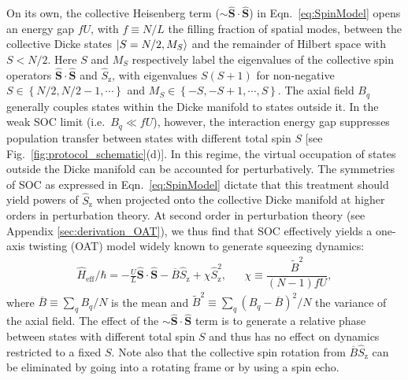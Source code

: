 \documentclass[aps,prx,superscriptaddress,notitlepage,twocolumn,longbibliography]{revtex4-2}
\renewcommand{\t}{\text} %
\newcommand{\f}[2]{\dfrac{#1}{#2}} %
\newcommand{\p}[1]{\left(#1\right)} %
\renewcommand{\set}[1]{\left\{#1\right\}} %
\renewcommand{\c}{\cdot} %
\renewcommand{\v}{\bm} %
\renewcommand{\ket}{\Ket}
\newcommand{\z}{\text{z}}
\begin{document}
On its own, the collective Heisenberg term ($\sim\hat{\v S}\c\hat{\v S}$) in Eqn.~\eqref{eq:SpinModel} opens an energy gap $fU$, with $f\equiv N/L$ the filling fraction of spatial modes, between the collective Dicke states $\ket{S=N/2, M_S}$ and the remainder of Hilbert space\cite{rey2008manybody, martin2013quantum, norcia2018cavitymediated, smale2019observation} with $S<N/2$.
Here $S$ and $M_S$ respectively label the eigenvalues of the collective spin operators $\hat{\v S}\c\hat{\v S}$ and $\hat{S}_\z$, with eigenvalues $S(S+1)$ for non-negative $S\in\set{N/2,N/2-1,\cdots}$ and $M_S\in\set{-S,-S+1,\cdots,S}$.
The axial field $B_q$ generally couples states within the Dicke manifold to states outside it.
In the weak SOC limit (i.e.~$B_q\ll fU$), however, the interaction energy gap suppresses population transfer between states with different total spin $S$ [see Fig.~\ref{fig:protocol_schematic}(d)].
In this regime, the virtual occupation of states outside the Dicke manifold can be accounted for perturbatively.
The symmetries of SOC as expressed in Eqn.~\eqref{eq:SpinModel} dictate that this treatment should yield powers of $\hat S_\z$ when projected onto the collective Dicke manifold at higher orders in perturbation theory.
At second order in perturbation theory (see Appendix \ref{sec:derivation_OAT}), we thus find that SOC effectively yields a one-axis twisting (OAT) model widely known to generate squeezing dynamics\cite{kitagawa1993squeezed, ma2011quantum}:
\begin{align}
  \hat H_{\t{eff}}/\hbar
  = -\frac{U}{L} \hat{\v S} \c \hat{\v S}
  - \overline B \hat S_\z + \chi \hat S_\z^2,
  &&
  \chi \equiv \f{\widetilde B^2}{(N-1)fU},
  \label{eq:H_eff}
\end{align}
where $\overline B\equiv\sum_q B_q/N$ is the mean and $\widetilde B^2\equiv\sum_q\p{B_q-\overline B}^2/N$ the variance of the axial field.
The effect of the $\sim\hat{\v S}\c\hat{\v S}$ term is to generate a relative phase between states with different total spin $S$ and thus has no effect on dynamics  restricted to a fixed $S$.
Note also that  the collective spin rotation from $\overline B \hat S_\z$  can be eliminated by going into a rotating frame or by using a spin echo.
\end{document}
